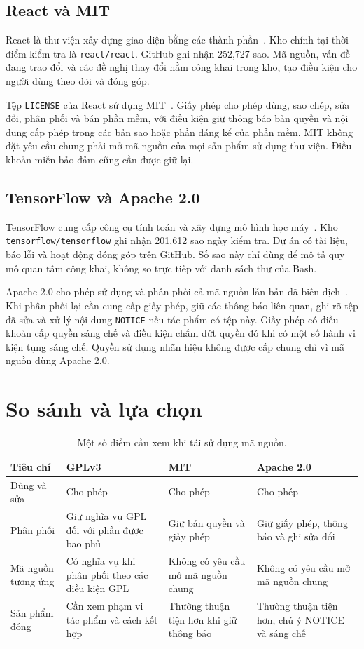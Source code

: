 \documentclass[runningheads]{llncs}
\begin{document}
\subsection{React và MIT}
React là thư viện xây dựng giao diện bằng các thành phần~\cite{react}. Kho chính tại thời điểm kiểm tra là \texttt{react/react}. GitHub ghi nhận 252,727 sao. Mã nguồn, vấn đề đang trao đổi và các đề nghị thay đổi nằm công khai trong kho, tạo điều kiện cho người dùng theo dõi và đóng góp.

Tệp \texttt{LICENSE} của React sử dụng MIT~\cite{mit}. Giấy phép cho phép dùng, sao chép, sửa đổi, phân phối và bán phần mềm, với điều kiện giữ thông báo bản quyền và nội dung cấp phép trong các bản sao hoặc phần đáng kể của phần mềm. MIT không đặt yêu cầu chung phải mở mã nguồn của mọi sản phẩm sử dụng thư viện. Điều khoản miễn bảo đảm cũng cần được giữ lại.

\subsection{TensorFlow và Apache 2.0}
TensorFlow cung cấp công cụ tính toán và xây dựng mô hình học máy~\cite{tensorflow}. Kho \texttt{tensorflow/tensorflow} ghi nhận 201,612 sao ngày kiểm tra. Dự án có tài liệu, báo lỗi và hoạt động đóng góp trên GitHub. Số sao này chỉ dùng để mô tả quy mô quan tâm công khai, không so trực tiếp với danh sách thư của Bash.

Apache 2.0 cho phép sử dụng và phân phối cả mã nguồn lẫn bản đã biên dịch~\cite{apache}. Khi phân phối lại cần cung cấp giấy phép, giữ các thông báo liên quan, ghi rõ tệp đã sửa và xử lý nội dung \texttt{NOTICE} nếu tác phẩm có tệp này. Giấy phép có điều khoản cấp quyền sáng chế và điều kiện chấm dứt quyền đó khi có một số hành vi kiện tụng sáng chế. Quyền sử dụng nhãn hiệu không được cấp chung chỉ vì mã nguồn dùng Apache 2.0.

\section{So sánh và lựa chọn}\label{sec:compare}
\begin{table}[ht]
\caption{Một số điểm cần xem khi tái sử dụng mã nguồn.}\label{tab:compare}
\small
\begin{tabularx}{\textwidth}{p{2.5cm}XXX}
\toprule
Tiêu chí & GPLv3 & MIT & Apache 2.0 \\
\midrule
Dùng và sửa & Cho phép & Cho phép & Cho phép \\
Phân phối & Giữ nghĩa vụ GPL đối với phần được bao phủ & Giữ bản quyền và giấy phép & Giữ giấy phép, thông báo và ghi sửa đổi \\
Mã nguồn tương ứng & Có nghĩa vụ khi phân phối theo các điều kiện GPL & Không có yêu cầu mở mã nguồn chung & Không có yêu cầu mở mã nguồn chung \\
Sản phẩm đóng & Cần xem phạm vi tác phẩm và cách kết hợp & Thường thuận tiện hơn khi giữ thông báo & Thường thuận tiện hơn, chú ý NOTICE và sáng chế \\
\bottomrule
\end{tabularx}
\end{table}
\end{document}
